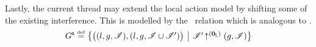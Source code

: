 
Lastly, the current thread may extend the local action model by shifting some of the existing interference. This is modelled by the \shiftG\ relation which is analogous to \shiftR.
%
\[
\shiftG \eqdef
\left\{
\begin{array}{@{} l @{\hspace*{5pt}} | @{\hspace*{5pt}} r @{}}
  \left(
  \begin{array}{@{} l @{}}
    (l, g, \lmod),
    \left( l, g, \lmod \cup \lmod'  \right)
  \end{array}
  \right)
  &
  \expandsAM{\lmod'}{\unitL}{g}{\lmod}
\end{array}
\right\}
\]

